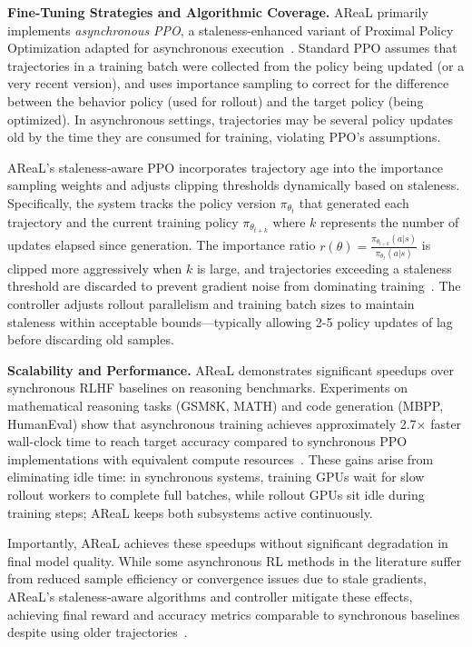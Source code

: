 \documentclass[conference]{IEEEtran}
\begin{document}
\textbf{Fine-Tuning Strategies and Algorithmic Coverage.} AReaL primarily implements \textit{asynchronous PPO}, a staleness-enhanced variant of Proximal Policy Optimization adapted for asynchronous execution~\cite{areal-paper}. Standard PPO assumes that trajectories in a training batch were collected from the policy being updated (or a very recent version), and uses importance sampling to correct for the difference between the behavior policy (used for rollout) and the target policy (being optimized). In asynchronous settings, trajectories may be several policy updates old by the time they are consumed for training, violating PPO's assumptions.

AReaL's staleness-aware PPO incorporates trajectory age into the importance sampling weights and adjusts clipping thresholds dynamically based on staleness. Specifically, the system tracks the policy version $\pi_{\theta_t}$ that generated each trajectory and the current training policy $\pi_{\theta_{t+k}}$ where $k$ represents the number of updates elapsed since generation. The importance ratio $r(\theta) = \frac{\pi_{\theta_{t+k}}(a|s)}{\pi_{\theta_t}(a|s)}$ is clipped more aggressively when $k$ is large, and trajectories exceeding a staleness threshold are discarded to prevent gradient noise from dominating training~\cite{areal-paper}. The controller adjusts rollout parallelism and training batch sizes to maintain staleness within acceptable bounds—typically allowing 2-5 policy updates of lag before discarding old samples.

\textbf{Scalability and Performance.} AReaL demonstrates significant speedups over synchronous RLHF baselines on reasoning benchmarks. Experiments on mathematical reasoning tasks (GSM8K, MATH) and code generation (MBPP, HumanEval) show that asynchronous training achieves approximately 2.7× faster wall-clock time to reach target accuracy compared to synchronous PPO implementations with equivalent compute resources~\cite{areal-paper}. These gains arise from eliminating idle time: in synchronous systems, training GPUs wait for slow rollout workers to complete full batches, while rollout GPUs sit idle during training steps; AReaL keeps both subsystems active continuously.

Importantly, AReaL achieves these speedups without significant degradation in final model quality. While some asynchronous RL methods in the literature suffer from reduced sample efficiency or convergence issues due to stale gradients, AReaL's staleness-aware algorithms and controller mitigate these effects, achieving final reward and accuracy metrics comparable to synchronous baselines despite using older trajectories~\cite{areal-paper}.
\end{document}
